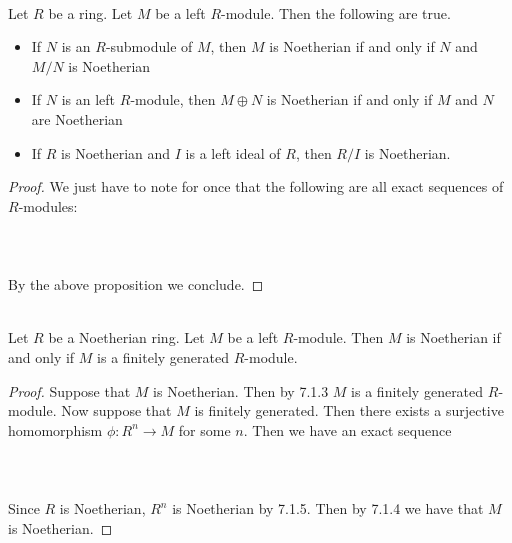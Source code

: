 \documentclass[a4paper]{article}
\begin{document}
\begin{crl}{}{}\\
Let $R$ be a ring. Let $M$ be a left $R$-module. Then the following are true. 
\begin{itemize}
\item If $N$ is an $R$-submodule of $M$, then $M$ is Noetherian if and only if $N$ and $M/N$ is Noetherian
\item If $N$ is an left $R$-module, then $M\oplus N$ is Noetherian if and only if $M$ and $N$ are Noetherian
\item If $R$ is Noetherian and $I$ is a left ideal of $R$, then $R/I$ is Noetherian. 
\end{itemize} 
\begin{proof}
We just have to note for once that the following are all exact sequences of $R$-modules: \\~\\
\\~\\
By the above proposition we conclude. 
\end{proof}
\end{crl}

\begin{crl}{}{}\\
Let $R$ be a Noetherian ring. Let $M$ be a left $R$-module. Then $M$ is Noetherian if and only if $M$ is a finitely generated $R$-module. 
\begin{proof}
Suppose that $M$ is Noetherian. Then by 7.1.3 $M$ is a finitely generated $R$-module. Now suppose that $M$ is finitely generated. Then there exists a surjective homomorphism $\phi:R^n\to M$ for some $n$. Then we have an exact sequence \\~\\
\\~\\
Since $R$ is Noetherian, $R^n$ is Noetherian by 7.1.5. Then by 7.1.4 we have that $M$ is Noetherian. 
\end{proof}
\end{crl}
\end{document}

